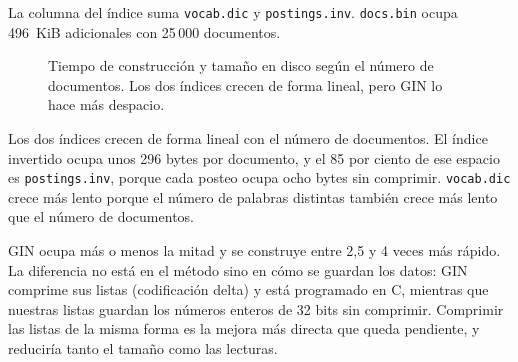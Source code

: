 La columna del índice suma \texttt{vocab.dic} y \texttt{postings.inv}.
\texttt{docs.bin} ocupa 496~KiB adicionales con 25\,000 documentos.

\begin{figure}[H]
\centering
{}
\caption{Tiempo de construcción y tamaño en disco según el número de
documentos. Los dos índices crecen de forma lineal, pero GIN lo hace más
despacio.}
\label{fig:e6-construccion}
\end{figure}

Los dos índices crecen de forma lineal con el número de documentos. El índice
invertido ocupa unos 296 bytes por documento, y el 85 por ciento de ese espacio
es \texttt{postings.inv}, porque cada posteo ocupa ocho bytes sin comprimir.
\texttt{vocab.dic} crece más lento porque el número de palabras distintas
también crece más lento que el número de documentos.

GIN ocupa más o menos la mitad y se construye entre 2,5 y 4 veces más rápido.
La diferencia no está en el método sino en cómo se guardan los datos: GIN
comprime sus listas (codificación delta) y está programado en C, mientras que
nuestras listas guardan los números enteros de 32 bits sin comprimir. Comprimir
las listas de la misma forma es la mejora más directa que queda pendiente, y
reduciría tanto el tamaño como las lecturas.

